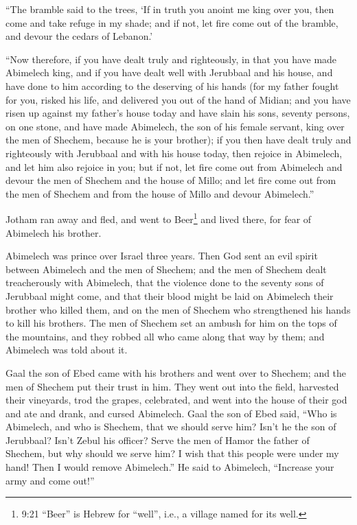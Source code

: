  ``The bramble said to the trees, `If in truth you anoint
me king over you, then come and take refuge in my shade; and if not, let
fire come out of the bramble, and devour the cedars of Lebanon.'

 ``Now therefore, if you have dealt truly and righteously,
in that you have made Abimelech king, and if you have dealt well with
Jerubbaal and his house, and have done to him according to the deserving
of his hands  (for my father fought for you, risked his
life, and delivered you out of the hand of Midian;  and you
have risen up against my father's house today and have slain his sons,
seventy persons, on one stone, and have made Abimelech, the son of his
female servant, king over the men of Shechem, because he is your
brother);  if you then have dealt truly and righteously
with Jerubbaal and with his house today, then rejoice in Abimelech, and
let him also rejoice in you;  but if not, let fire come out
from Abimelech and devour the men of Shechem and the house of Millo; and
let fire come out from the men of Shechem and from the house of Millo
and devour Abimelech.''

 Jotham ran away and fled, and went to Beer\footnote{9:21
  ``Beer'' is Hebrew for ``well'', i.e., a village named for its well.}
and lived there, for fear of Abimelech his brother.

 Abimelech was prince over Israel three years.
 Then God sent an evil spirit between Abimelech and the men
of Shechem; and the men of Shechem dealt treacherously with Abimelech,
 that the violence done to the seventy sons of Jerubbaal
might come, and that their blood might be laid on Abimelech their
brother who killed them, and on the men of Shechem who strengthened his
hands to kill his brothers.  The men of Shechem set an
ambush for him on the tops of the mountains, and they robbed all who
came along that way by them; and Abimelech was told about it.

 Gaal the son of Ebed came with his brothers and went over
to Shechem; and the men of Shechem put their trust in him. 
They went out into the field, harvested their vineyards, trod the
grapes, celebrated, and went into the house of their god and ate and
drank, and cursed Abimelech.  Gaal the son of Ebed said,
``Who is Abimelech, and who is Shechem, that we should serve him? Isn't
he the son of Jerubbaal? Isn't Zebul his officer? Serve the men of Hamor
the father of Shechem, but why should we serve him?  I wish
that this people were under my hand! Then I would remove Abimelech.'' He
said to Abimelech, ``Increase your army and come out!''

